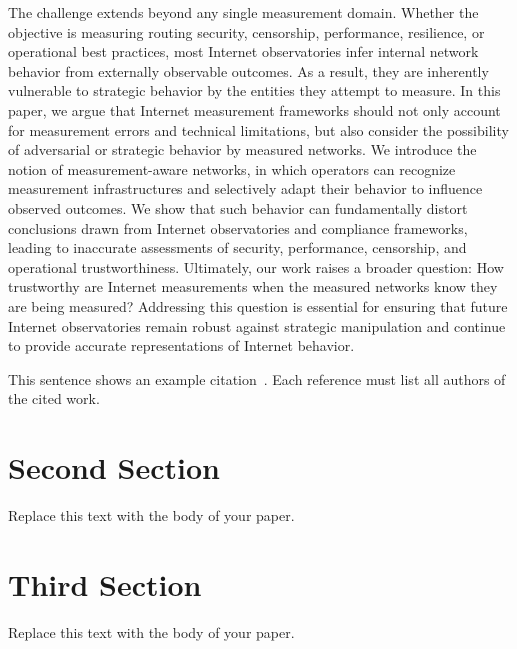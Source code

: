 \documentclass[sigconf, 10pt, anonymous, nonacm]{acmart}
\begin{document}
The challenge extends beyond any single measurement domain. Whether the objective is measuring routing security, censorship, performance, resilience, or operational best practices, most Internet observatories infer internal network behavior from externally observable outcomes. As a result, they are inherently vulnerable to strategic behavior by the entities they attempt to measure.
In this paper, we argue that Internet measurement frameworks should not only account for measurement errors and technical limitations, but also consider the possibility of adversarial or strategic behavior by measured networks. We introduce the notion of measurement-aware networks, in which operators can recognize measurement infrastructures and selectively adapt their behavior to influence observed outcomes. We show that such behavior can fundamentally distort conclusions drawn from Internet observatories and compliance frameworks, leading to inaccurate assessments of security, performance, censorship, and operational trustworthiness.
Ultimately, our work raises a broader question: How trustworthy are Internet measurements when the measured networks know they are being measured? Addressing this question is essential for ensuring that future Internet observatories remain robust against strategic manipulation and continue to provide accurate representations of Internet behavior.


This sentence shows an example citation~\cite{cerf-kahn-1974}. Each reference
must list all authors of the cited work.

\section{Second Section}

Replace this text with the body of your paper.

\section{Third Section}

Replace this text with the body of your paper.



\end{document}
